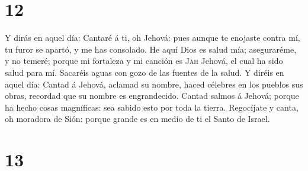 \hypertarget{section-11}{%
\section{12}\label{section-11}}

 Y dirás en aquel día: Cantaré á ti, oh Jehová: pues
aunque te enojaste contra mí, tu furor se apartó, y me has consolado.
 He aquí Dios es salud mía; aseguraréme, y no temeré;
porque mi fortaleza y mi canción es \textsc{Jah} Jehová, el cual ha sido
salud para mí.  Sacaréis aguas con gozo de las fuentes de
la salud.  Y diréis en aquel día: Cantad á Jehová, aclamad
su nombre, haced célebres en los pueblos sus obras, recordad que su
nombre es engrandecido.  Cantad salmos á Jehová; porque ha
hecho cosas magníficas: sea sabido esto por toda la tierra.
 Regocíjate y canta, oh moradora de Sión: porque grande es
en medio de ti el Santo de Israel.

\hypertarget{section-12}{%
\section{13}\label{section-12}}

